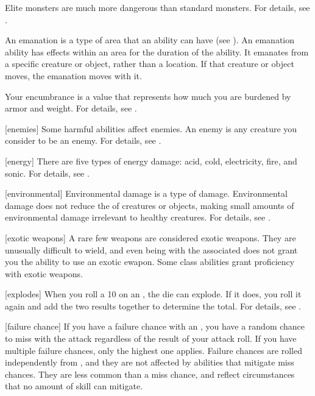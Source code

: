  Elite monsters are much more dangerous than standard monsters.
For details, see .

 An emanation is a type of area that an ability can have (see ).
An emanation ability has effects within an area for the duration of the ability.
It emanates from a specific creature or object, rather than a location.
If that creature or object moves, the emanation moves with it.

 Your encumbrance is a value that represents how much you are burdened by armor and weight.
For details, see .

[enemies] Some harmful abilities affect enemies.
An enemy is any creature you consider to be an enemy.
For details, see .

[energy] There are five types of energy damage: acid, cold, electricity, fire, and sonic.
For details, see .

[environmental] Environmental damage is a type of damage.
Environmental damage does not reduce the  of creatures or objects, making small amounts of environmental damage irrelevant to healthy creatures.
For details, see .

[exotic weapons] A rare few weapons are considered exotic weapons.
They are unusually difficult to wield, and even being  with the associated  does not grant you the ability to use an exotic ewapon.
Some class abilities grant proficiency with exotic weapons.

[explodes] When you roll a 10 on an , the die can explode.
If it does, you roll it again and add the two results together to determine the total.
For details, see .

[failure chance] If you have a failure chance with an , you have a random chance to miss with the attack regardless of the result of your attack roll.
If you have multiple failure chances, only the highest one applies.
Failure chances are rolled independently from , and they are not affected by abilities that mitigate miss chances.
They are less common than a miss chance, and reflect circumstances that no amount of skill can mitigate.

